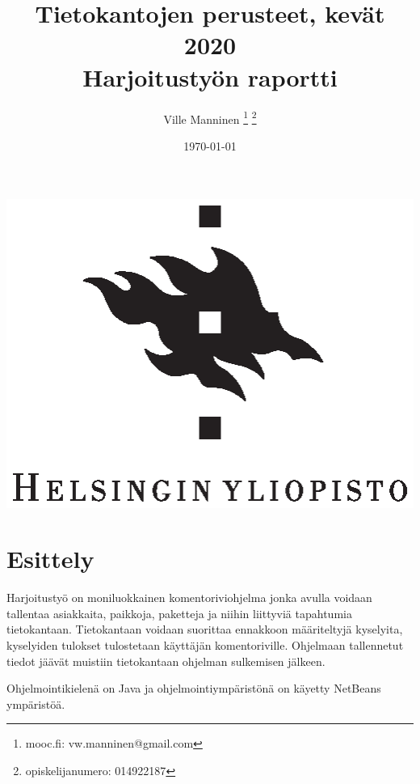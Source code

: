 \documentclass[11pt,a4paper]{article}
\begin{document}
\author{Ville Manninen
\thanks{mooc.fi: vw.manninen@gmail.com}
\thanks{opiskelijanumero: 014922187}}
\date{\today}
\title{Tietokantojen perusteet, kevät 2020 \\
Harjoitustyön raportti}
\maketitle
\begin{center}
\vspace{2cm}
\includegraphics{university-of-helsinki-2.eps} 
\end{center}
\newpage
\tableofcontents
\newpage
\section{Esittely}
Harjoitustyö on moniluokkainen komentoriviohjelma jonka avulla voidaan tallentaa asiakkaita, paikkoja, paketteja ja niihin liittyviä tapahtumia tietokantaan. Tietokantaan voidaan suorittaa ennakkoon määriteltyjä kyselyita, kyselyiden tulokset tulostetaan käyttäjän komentoriville. Ohjelmaan tallennetut tiedot jäävät muistiin tietokantaan ohjelman sulkemisen jälkeen.

Ohjelmointikielenä on Java ja ohjelmointiympäristönä on käyetty NetBeans ympäristöä.
\end{document}
